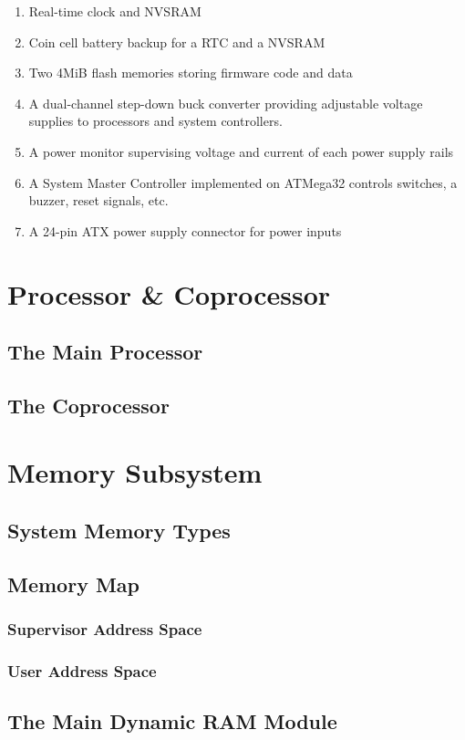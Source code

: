 \documentclass[11pt]{report}
\begin{document}
\begin{flushleft}
\begin{enumerate}
        \item Real-time clock and NVSRAM
        \item Coin cell battery backup for a RTC and a NVSRAM
        \item Two 4MiB flash memories storing firmware code and data
        \item A dual-channel step-down buck converter providing adjustable voltage supplies to processors and system controllers.
        \item A power monitor supervising voltage and current of each power supply rails
        \item A System Master Controller implemented on ATMega32 controls switches, a buzzer, reset signals, etc.
        \item A 24-pin ATX power supply connector for power inputs
    \end{enumerate}
\end{flushleft}

\chapter{Processor \& Coprocessor}
\section{The Main Processor}
\section{The Coprocessor}
\chapter{Memory Subsystem}
\section{System Memory Types}
\section{Memory Map}
\subsection{Supervisor Address Space}
\subsection{User Address Space}
\section{The Main Dynamic RAM Module}
\end{document}
